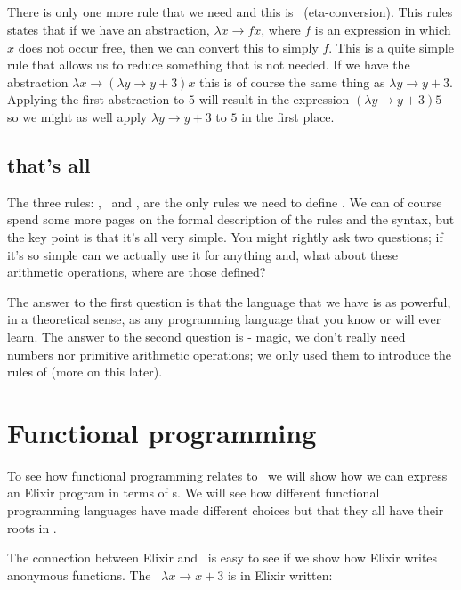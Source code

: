 \documentclass[a4paper,11pt]{article}
\begin{document}
\subsection{\etac}

There is only one more rule that we need and this is \etac\
(eta-conversion). This rules states that if we have an abstraction,
$\lambda x \rightarrow f x$, where $f$ is an expression in which $x$
does not occur free, then we can convert this to simply $f$. This is a
quite simple rule that allows us to reduce something that is not
needed. If we have the abstraction
$\lambda x \rightarrow (\lambda y \rightarrow y + 3) x$ this is of
course the same thing as $\lambda y \rightarrow y + 3$.  Applying the
first abstraction to $5$ will result in the expression
$(\lambda y \rightarrow y + 3) 5$ so we might as well apply
$\lambda y \rightarrow y + 3$ to $5$ in the first place.

\subsection{that's all}

The three rules: \alphac, \betar\ and \etac, are the only rules we
need to define \lamc. We can of course spend some more pages on the
formal description of the rules and the syntax, but the key point is
that it's all very simple. You might rightly ask two questions; if
it's so simple can we actually use it for anything and, what about
these arithmetic operations, where are those defined? 

The answer to the first question is that the language that we have is
as powerful, in a theoretical sense, as any programming language that
you know or will ever learn. The answer to the second question is -
magic, we don't really need numbers nor primitive arithmetic
operations; we only used them to introduce the rules of \lamc (more on
this later).

\section{Functional programming}

To see how functional programming relates to \lamc\ we will show how
we can express an Elixir program in terms of \lame s. We will see how
different functional programming languages have made different choices
but that they all have their roots in \lamc.

The connection between Elixir and \lamc\ is easy to see if we show how
Elixir writes anonymous functions. The \lama\
$\lambda x \rightarrow x + 3$ is in Elixir written:
\end{document}
